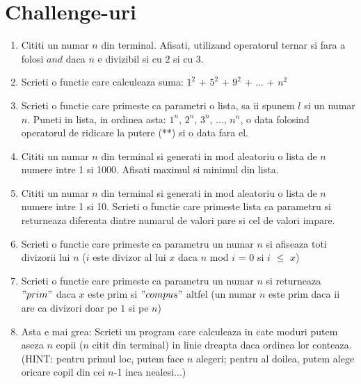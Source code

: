 \documentclass{article}
\begin{document}
\section{Challenge-uri}
    \begin{enumerate}
        \item Cititi un numar $n$ din terminal. Afisati, utilizand operatorul ternar si fara a folosi $and$ daca $n$ e divizibil si cu $2$ si cu $3$.
        \item Scrieti o functie care calculeaza suma: $1^{2}$ + $5^{2}$ + $9^{2}$ + ... + $n^{2}$
        \item Scrieti o functie care primeste ca parametri o lista, sa ii spunem $l$ si un numar $n$. Puneti in lista, in ordinea asta: $1^{n}$, $2^{n}$, $3^{n}$, ..., $n^{n}$, o data folosind operatorul de ridicare la putere (**) si o data fara el.
        \item Cititi un numar $n$ din terminal si generati in mod aleatoriu o lista de $n$ numere intre 1 si 1000. Afisati maximul si minimul din lista.
        \item Cititi un numar $n$ din terminal si generati in mod aleatoriu o lista de $n$ numere intre 1 si 10. Scrieti o functie care primeste lista ca parametru si returneaza diferenta dintre numarul de valori pare si cel de valori impare.
        \item Scrieti o functie care primeste ca parametru un numar $n$ si afiseaza toti divizorii lui $n$ ($i$ este divizor al lui $x$ daca $n$ mod $i$ = $0$ si $i$ $\leq$ $x$)
        \item Scrieti o functie care primeste ca parametru un numar $n$ si returneaza $"prim"$ daca $x$ este prim si $"compus"$ altfel (un numar $n$ este prim daca ii are ca divizori doar pe $1$ si pe $n$)
        \item Asta e mai grea: Scrieti un program care calculeaza in cate moduri putem aseza $n$ copii ($n$ citit din terminal) in linie dreapta daca ordinea lor conteaza. (HINT: pentru primul loc, putem face $n$ alegeri; pentru al doilea, putem alege oricare copil din cei $n$-1 inca nealesi...)
    \end{enumerate}
\end{document}

